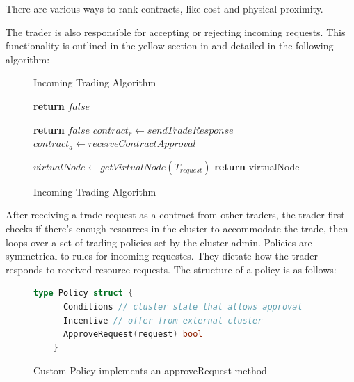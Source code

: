 There are various ways to rank contracts, like cost and physical proximity. 

The trader is also responsible for accepting or rejecting incoming requests.
This functionality is outlined in the yellow section in  and
detailed in the following algorithm: 

\begin{figure}[H]
\begin{algorithm}[H]
\caption{Incoming Trading Algorithm}
\begin{algorithmic}
   
    
     
      \State \textbf{return} $false$ 
    \EndIf

      \State \textbf{return} $false$ 
      \EndIf
    \EndFor
    \State $contract_r \gets sendTradeResponse$ 
    \State $contract_a \gets receiveContractApproval$ 

    \State $virtualNode \gets getVirtualNode(T_{request})$     
    \State \textbf{return} virtualNode 
  \EndProcedure
\end{algorithmic}
\end{algorithm}
\caption{Incoming Trading Algorithm}
\end{figure}

After receiving a trade request as a contract from other traders, the trader
first checks if there's enough resources in the cluster to accommodate the
trade, then loops over a set of trading policies set by the cluster admin.
Policies are symmetrical to rules for incoming requestes. They dictate how the
trader responds to received resource requests. The structure of a policy is
as follows:

\begin{figure}[H]
  \begin{lstlisting}[language=go]
    type Policy struct {
      Conditions // cluster state that allows approval
      Incentive // offer from external cluster
      ApproveRequest(request) bool 
    } 
  \end{lstlisting}
  \caption{Custom Policy implements an approveRequest method}
\end{figure}


